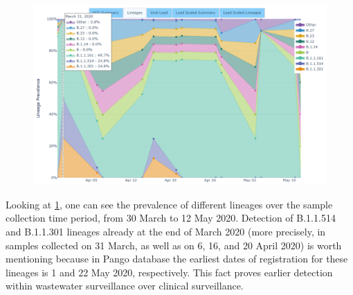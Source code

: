     \begin{figure}[ht!]
        \centering
        \includegraphics[width=1\textwidth]{figures/results/real/uk-freyja-dash-early-detection.png}
        \label{fig:results:real:uk-freyja-dash}
    \end{figure}
    
    Looking at \cref{fig:results:real:uk-freyja-dash}, one can see the prevalence of different lineages over the sample collection time period, from 30 March to 12 May 2020. Detection of B.1.1.514 and B.1.1.301 lineages already at the end of March 2020 (more precisely, in samples collected on 31 March, as well as on 6, 16, and 20 April 2020) is worth mentioning because in Pango database \cite{covlineages} the earliest dates of registration for these lineages is 1 and 22 May 2020, respectively. This fact proves earlier detection within wastewater surveillance over clinical surveillance.





\clearpage
